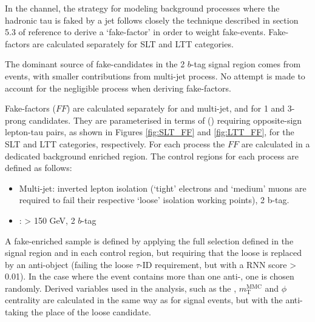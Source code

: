 In the \lephad channel, the strategy for modeling background processes where the hadronic tau is faked by a jet follows 
closely the technique described in section 5.3 of reference \cite{AlvarezPiqueras:2131232} to derive a \tauhad `fake-factor' 
in order to weight fake-\tauhad events. Fake-factors are calculated separately for SLT and LTT categories. 

The dominant source of fake-\tauhad candidates in the 2 $b$-tag signal region comes from \ttbar events, with smaller contributions from multi-jet process. 
No attempt is made to account for the negligible \Wjets process  when deriving fake-factors.

Fake-factors ($FF$) are calculated separately for \ttbar and multi-jet, and for 1 and 3-prong \tauhad candidates. 
They are parameterised in terms of \pT(\tauhad) requiring opposite-sign lepton-tau pairs, as shown in Figures \ref{fig:SLT_FF} and \ref{fig:LTT_FF}, for the SLT and LTT categories, respectively.
For each process the $FF$ are calculated in a dedicated background enriched region. The control regions for each process are defined as follows:
 \begin{itemize}
 	\item Multi-jet: inverted lepton isolation (`tight' electrons and `medium' muons are required to fail their respective ‘loose’ isolation working points), 2 b-tag. 
 	\item \ttbar: \mbb > 150 GeV, 2 $b$-tag 
 \end{itemize}
 
A fake-\tauhad enriched sample is defined by applying the full selection defined in the signal region and in each control region, 
but requiring that the loose \tauhad is replaced by an anti-\tauhad object (failing the loose $\tau$-ID requirement, but with a RNN score > 0.01). 
In the case where the event contains more than one anti-\tauhad, one is chosen randomly. Derived variables used in the analysis,
such as the \MET, $m^{\mathrm{MMC}}_\mathrm{T}$ and \MET$\phi$ centrality are calculated in the same way as for signal events, 
but with the anti-\tauhad taking the place of the loose \tauhad candidate.

